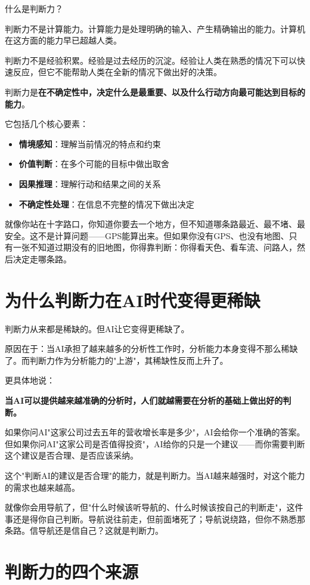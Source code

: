 什么是判断力？

判断力不是计算能力。计算能力是处理明确的输入、产生精确输出的能力。计算机在这方面的能力早已超越人类。

判断力不是经验积累。经验是过去经历的沉淀。经验让人类在熟悉的情况下可以快速反应，但它不能帮助人类在全新的情况下做出好的决策。

判断力是\textbf{在不确定性中，决定什么是最重要、以及什么行动方向最可能达到目标的能力}。

它包括几个核心要素：

\begin{itemize}
\item \textbf{情境感知}：理解当前情况的特点和约束
\item \textbf{价值判断}：在多个可能的目标中做出取舍
\item \textbf{因果推理}：理解行动和结果之间的关系
\item \textbf{不确定性处理}：在信息不完整的情况下做出决定

\end{itemize}
就像你站在十字路口，你知道你要去一个地方，但不知道哪条路最近、最不堵、最安全。这不是计算问题——GPS能算出来。但如果你没有GPS、也没有地图、只有一张不知道过期没有的旧地图，你得靠判断：你得看天色、看车流、问路人，然后决定走哪条路。

\section{为什么判断力在AI时代变得更稀缺}


判断力从来都是稀缺的。但AI让它变得更稀缺了。

原因在于：当AI承担了越来越多的分析性工作时，分析能力本身变得不那么稀缺了。而判断力作为分析能力的"上游"，其稀缺性反而上升了。

更具体地说：

\textbf{当AI可以提供越来越准确的分析时，人们就越需要在分析的基础上做出好的判断。}

如果你问AI"这家公司过去五年的营收增长率是多少"，AI会给你一个准确的答案。但如果你问AI"这家公司是否值得投资"，AI给你的只是一个建议——而你需要判断这个建议是否合理、是否应该采纳。

这个"判断AI的建议是否合理"的能力，就是判断力。当AI越来越强时，对这个能力的需求也越来越高。

就像你会用导航了，但"什么时候该听导航的、什么时候该按自己的判断走"，这件事还是得你自己判断。导航说往前走，但前面堵死了；导航说绕路，但你不熟悉那条路。信导航还是信自己？这就是判断力。

\section{判断力的四个来源}


